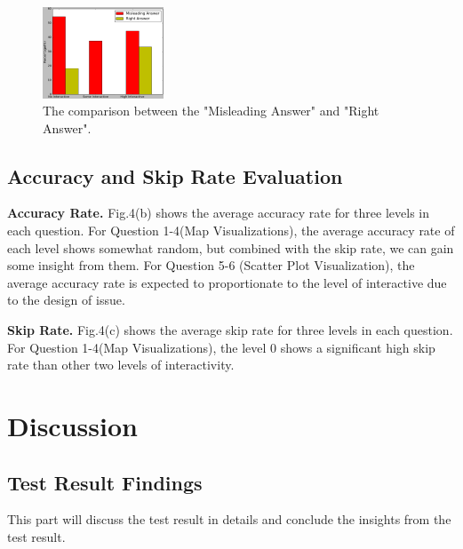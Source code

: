 \documentclass[9pt,journal,compsoc]{IEEEtran}
\begin{document}
\begin{figure} [H]
  \centering
  \includegraphics[width=0.32\textwidth]{MisleadingQ6.png}
  \caption{The comparison between the "Misleading Answer" and "Right Answer".}
\end{figure}

\subsection{Accuracy and Skip Rate Evaluation}
\textbf{Accuracy Rate.} Fig.4(b) shows the average accuracy rate for three levels in each question. For Question 1-4(Map Visualizations), the average accuracy rate of each level shows somewhat random, but combined with the skip rate, we can gain some insight from them. For Question 5-6 (Scatter Plot Visualization), the average accuracy rate is expected to proportionate to the level of interactive due to the design of issue. 

\textbf{Skip Rate.} Fig.4(c) shows the average skip rate for three levels in each question. For Question 1-4(Map Visualizations), the level 0 shows a significant high skip rate than other two levels of interactivity. \\



\section{Discussion}
\large
\subsection{Test Result Findings}
This part will discuss the test result in details and conclude the insights from the test result.
\end{document}
